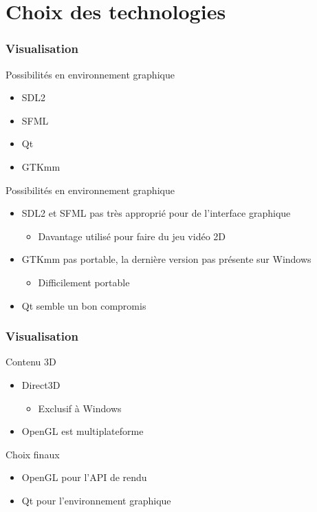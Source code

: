 \documentclass[handout]{beamer}
\begin{document}
\section{Choix des technologies}
\begin{frame}
  \frametitle{Visualisation}

  \begin{block}{Possibilités en environnement graphique}
    \begin{itemize}
    \item SDL2
    \item SFML
    \item Qt
    \item GTKmm
    \end{itemize}
  \end{block}

  \begin{block}{Possibilités en environnement graphique}
    \begin{itemize}
    \item SDL2 et SFML pas très approprié pour de l'interface graphique
      \begin{itemize}
      \item Davantage utilisé pour faire du jeu vidéo 2D
      \end{itemize}
    \item GTKmm pas portable, la dernière version pas présente sur Windows
      \begin{itemize}
      \item Difficilement portable
      \end{itemize}
    \item Qt semble un bon compromis
    \end{itemize}
  \end{block}
\end{frame}

\begin{frame}
  \frametitle{Visualisation}
    
  \begin{block}{Contenu 3D}
    \begin{itemize}
    \item Direct3D
      \begin{itemize}
      \item Exclusif à Windows
      \end{itemize}          
    \item OpenGL est multiplateforme
    \end{itemize}
  \end{block}
  
  \begin{exampleblock}{Choix finaux}
    \begin{itemize}
    \item OpenGL pour l'API de rendu
    \item Qt pour l'environnement graphique
    \end{itemize}
  \end{exampleblock}
\end{frame}
\end{document}
